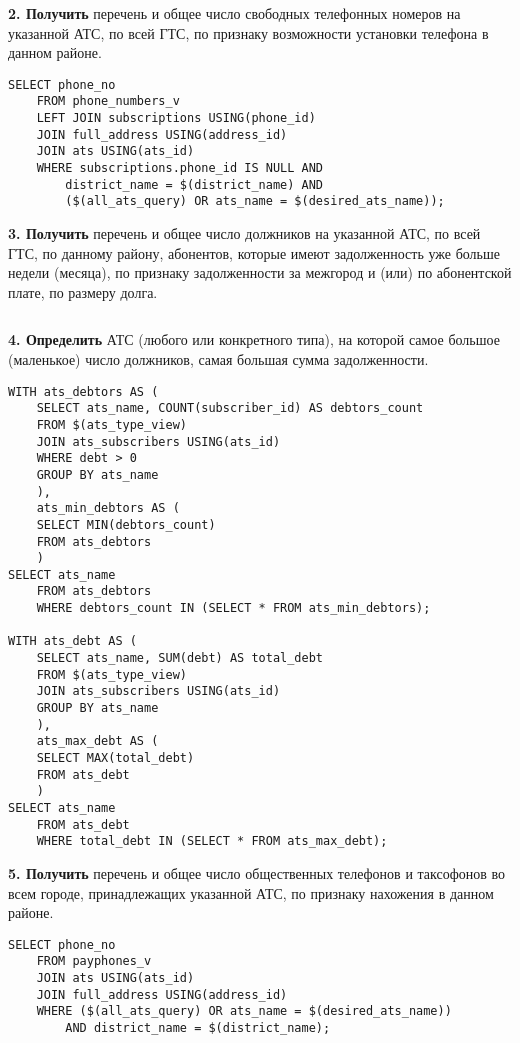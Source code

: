 \documentclass{report}
\begin{document}
\textbf{2. Получить} перечень и общее число свободных телефонных 
номеров на указанной АТС, по всей ГТС, по признаку возможности установки 
телефона в данном районе.

\begin{lstlisting}
SELECT phone_no 
    FROM phone_numbers_v
    LEFT JOIN subscriptions USING(phone_id)
    JOIN full_address USING(address_id)
    JOIN ats USING(ats_id)
    WHERE subscriptions.phone_id IS NULL AND 
        district_name = $(district_name) AND 
        ($(all_ats_query) OR ats_name = $(desired_ats_name));
\end{lstlisting}

\textbf{3. Получить} перечень и общее число должников на указанной АТС, 
по всей ГТС, по данному району, абонентов, которые имеют задолженность 
уже больше недели (месяца), по признаку задолженности за межгород и (или) 
по абонентской плате, по размеру долга.

\begin{lstlisting}

\end{lstlisting}

\textbf{4. Определить} АТС (любого или конкретного типа), на которой 
самое большое (маленькое) число должников, самая большая сумма задолженности.

\begin{lstlisting}
WITH ats_debtors AS (
    SELECT ats_name, COUNT(subscriber_id) AS debtors_count
    FROM $(ats_type_view) 
    JOIN ats_subscribers USING(ats_id)
    WHERE debt > 0
    GROUP BY ats_name
    ), 
    ats_min_debtors AS (
    SELECT MIN(debtors_count)
    FROM ats_debtors 
    )
SELECT ats_name
    FROM ats_debtors
    WHERE debtors_count IN (SELECT * FROM ats_min_debtors);

WITH ats_debt AS (
    SELECT ats_name, SUM(debt) AS total_debt
    FROM $(ats_type_view) 
    JOIN ats_subscribers USING(ats_id)
    GROUP BY ats_name
    ), 
    ats_max_debt AS (
    SELECT MAX(total_debt)
    FROM ats_debt 
    )
SELECT ats_name
    FROM ats_debt
    WHERE total_debt IN (SELECT * FROM ats_max_debt);
\end{lstlisting}

\textbf{5. Получить} перечень и общее число общественных телефонов и 
таксофонов во всем городе, принадлежащих указанной АТС, по признаку 
нахожения в данном районе.

\begin{lstlisting}
SELECT phone_no
    FROM payphones_v
    JOIN ats USING(ats_id)
    JOIN full_address USING(address_id)
    WHERE ($(all_ats_query) OR ats_name = $(desired_ats_name))
        AND district_name = $(district_name);
\end{lstlisting}
\end{document}

